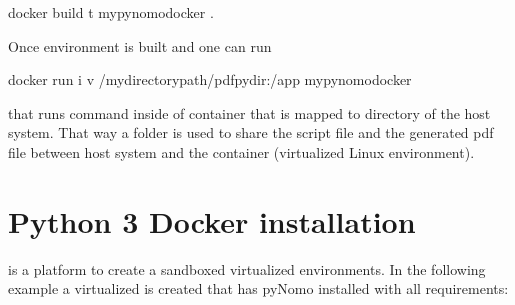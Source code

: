 \documentclass[a4paper,11pt,english]{sphinxmanual}
\begin{document}
\begin{sphinxVerbatim}[commandchars=\\\{\},formatcom=\scriptsize]
\PYGZdl{} docker build \PYGZhy{}t my\PYGZus{}pynomo\PYGZus{}docker .
\end{sphinxVerbatim}

Once environment is built and  one can run

\begin{sphinxVerbatim}[commandchars=\\\{\},formatcom=\scriptsize]
\PYGZdl{} docker run \PYGZhy{}i \PYGZhy{}v /my\PYGZus{}directory\PYGZus{}path/pdf\PYGZus{}py\PYGZus{}dir:/app my\PYGZus{}pynomo\PYGZus{}docker
\end{sphinxVerbatim}

that runs command  inside  of container that is mapped to directory  of the host system.
That way a folder is used to share the script file and the generated pdf file between host system and the container (virtualized
Linux environment).


\section{Python 3 Docker installation}
\label{\detokenize{installation/installation:python-3-docker-installation}}
 is a platform to create a sandboxed virtualized environments. In the following example  a virtualized
 is created that has pyNomo installed with all requirements:
\end{document}

